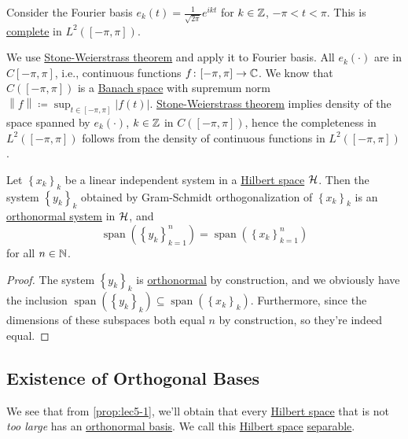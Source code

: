 \begin{eg}
	Consider the Fourier basis \(e_k (t) = \frac{1}{\sqrt{2\pi }} e^{ikt}\) for \(k\in \mathbb{\MakeUppercase{z}} \), \(-\pi < t < \pi \). This is \hyperref[def:complete-system]{complete} in \(L^2([-\pi , \pi ])\).
\end{eg}
\begin{explanation}
	We use \href{https://en.wikipedia.org/wiki/Stone%E2%80%93Weierstrass_theorem}{Stone-Weierstrass theorem} and apply it to Fourier basis. All \(e_k(\cdot)\) are in \(C[-\pi , \pi ]\), i.e., continuous functions \(f\colon [-\pi , \pi ]\to \mathbb{\MakeUppercase{c}} \). We know that \(C([-\pi , \pi ])\) is a \hyperref[def:Banach-space]{Banach space} with supremum norm \(\left\lVert f\right\rVert \coloneqq \sup _{t\in [-\pi, \pi ]}\left\vert f(t) \right\vert\). \href{https://en.wikipedia.org/wiki/Stone%E2%80%93Weierstrass_theorem}{Stone-Weierstrass theorem} implies density of the space spanned by \(e_k(\cdot)\), \(k\in \mathbb{\MakeUppercase{z}} \) in \(C([-\pi , \pi ])\), hence the completeness in \(L^2([-\pi , \pi ])\) follows from the density of continuous functions in \(L^2([-\pi , \pi ])\). 
\end{explanation}

\begin{proposition}\label{prop:lec5-1}
	Let \(\left\{ x_k \right\} _k\) be a linear independent system in a \hyperref[def:Hilbert-space]{Hilbert space} \(\mathcal{\MakeUppercase{h}} \). Then the system \(\left\{ y_k \right\} _k\) obtained by Gram-Schmidt orthogonalization of \(\left\{ x_k \right\} _k\) is an \hyperref[def:orthonormal-system]{orthonormal system} in \(\mathcal{\MakeUppercase{h}} \), and
	\[
		\mathop{\mathrm{span}}(\left\{ y_k \right\} _{k=1}^n) = \mathop{\mathrm{span}}(\left\{ x_k \right\} _{k=1}^n)
	\]
	for all \(n\in \mathbb{\MakeUppercase{n}} \).
\end{proposition}
\begin{proof}
	The system \(\left\{ y_k \right\} _k\) is \hyperref[def:orthonormal-system]{orthonormal} by construction, and we obviously have the inclusion \(\mathop{\mathrm{span}}(\left\{ y_k \right\} _k) \subseteq \mathop{\mathrm{span}}(\left\{ x_k \right\} _k)\). Furthermore, since the dimensions of these subspaces both equal \(n\) by construction, so they're indeed equal.
\end{proof}

\subsection{Existence of Orthogonal Bases}
We see that from \autoref{prop:lec5-1}, we'll obtain that every \hyperref[def:Hilbert-space]{Hilbert space} that is not \emph{too large} has an \hyperref[def:orthonormal-basis]{orthonormal basis}. We call this \hyperref[def:Hilbert-space]{Hilbert space} \hyperref[def:separable]{separable}.

